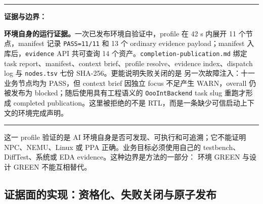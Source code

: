 \documentclass[UTF8,a4paper,zihao=-4,oneside]{ctexart}
\newenvironment{evidencebox}{%
  \par\smallskip
  \begingroup\small
  \noindent\rule{\linewidth}{0.4pt}\par\smallskip
  \noindent\textbf{证据与边界：}\ignorespaces
}{%
  \par\smallskip\noindent\rule{\linewidth}{0.4pt}
  \endgroup\par\medskip
}
\begin{document}
\newcommand{\TableAgentSystemGroups}{%
\begin{table}[H]
  \centering
  \small
  \caption{环境自验证图的责任分组而非文件逐行解释}
  \label{tab:agent-system-groups}
  \begin{tabularx}{\linewidth}{@{}L{0.22\linewidth}L{0.34\linewidth}Y@{}}
    \toprule
    方法责任 & 代表节点 & 所验证的边界 \\
    \midrule
    启动上下文与场景身份 & discovery、tool environment、backend status & 规则、工具和当前 target 可发现，但不证明 RTL 正确 \\
    知识/运行物边界 & 三层环境合同（规则、Skill 与运行物分层）、运行时产物边界 & active rule、Skill、日志与重型产物没有互相冒充 \\
    控制与审查责任 & state traceback、reviewer/inspector、RTL task contract & 状态可回溯、实现者不能自证、越界合同被拒绝 \\
    证据与交付资格 & fail-closed status、delivery readiness、profile index & 不完整长跑不能 PASS，能力可打包且确实有调度入口 \\
    \bottomrule
  \end{tabularx}
\end{table}
}%

\begin{evidencebox}
\textbf{环境自身的运行证据。}一次已发布环境自验证中，profile 在 42 s 内展开 11 个节点，manifest 记录
\texttt{PASS=11/11} 和 13 个 ordinary evidence payload；manifest 入库后，\texttt{evidence} API 共可查询
14 个资产。\texttt{completion-publication.md} 绑定 task report、manifest、context brief、profile
resolve、evidence index、dispatch log 与 \texttt{nodes.tsv} 七份 SHA-256。更能说明失败关闭的是
另一次故障注入：十一业务节点均为 PASS，但 context brief 因独立 focus
不足产生 WARN，overall 仍被发布为 blocked；随后使用具有工程语义的 \texttt{OooIntBackend} task slug
重跑才形成 completed publication。这里被拒绝的不是 RTL，而是一条缺少可信启动上下文的环境完成声明。
\end{evidencebox}

这一 profile 验证的是 AI 环境自身是否可发现、可执行和可追溯；它不能证明 NPC、NEMU、Linux 或 PPA
正确。业务目标必须使用自己的 testbench、DiffTest、系统或 EDA evidence。这种边界是方法的一部分：
环境 GREEN 与设计 GREEN 不能互相替代。

\subsection{证据面的实现：资格化、失败关闭与原子发布}
\end{document}
